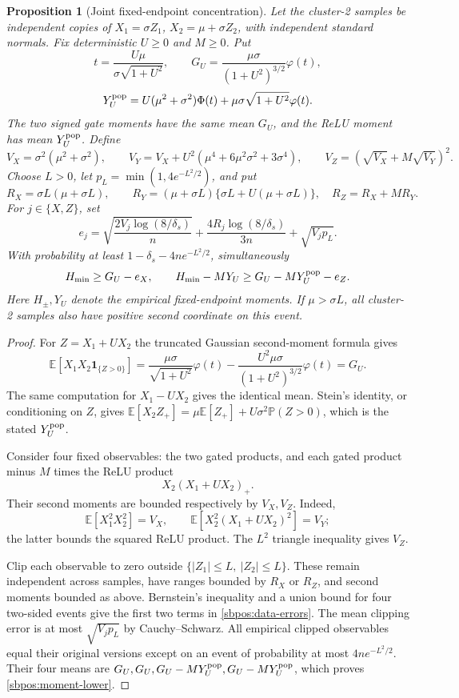 \documentclass{article} %
\theoremstyle{plain}
\newtheorem{proposition}[theorem]{Proposition}
\theoremstyle{definition}
\theoremstyle{remark}
\begin{document}
\begin{proposition}[Joint fixed-endpoint concentration]
\label{sbpos:concentration}
Let the cluster-2 samples be independent copies of
$X_1=\sigma Z_1$, $X_2=\mu+\sigma Z_2$, with independent standard normals.
Fix deterministic $U\ge0$ and $M\ge0$. Put
\[
 t=\frac{U\mu}{\sigma\sqrt{1+U^2}},\qquad
 G_U=\frac{\mu\sigma}{(1+U^2)^{3/2}}\varphi(t),
\]
\[
 Y_U^{\rm pop}=U(\mu^2+\sigma^2)\Phi(t)
                    +\mu\sigma\sqrt{1+U^2}\varphi(t).
\]
The two signed gate moments have the same mean $G_U$, and the ReLU
moment has mean $Y_U^{\rm pop}$. Define
\[
 V_X=\sigma^2(\mu^2+\sigma^2),\qquad
 V_Y=V_X+U^2(\mu^4+6\mu^2\sigma^2+3\sigma^4),\qquad
 V_Z=(\sqrt{V_X}+M\sqrt{V_Y})^2.
\]
Choose $L>0$, let $p_L=\min(1,4e^{-L^2/2})$, and put
\[
 R_X=\sigma L(\mu+\sigma L),\qquad
 R_Y=(\mu+\sigma L)\{\sigma L+U(\mu+\sigma L)\},\quad
 R_Z=R_X+MR_Y.
\]
For $j\in\{X,Z\}$, set
\begin{equation}\label{sbpos:data-errors}
 e_j=\sqrt{\frac{2V_j\log(8/\delta_s)}n}
       +\frac{4R_j\log(8/\delta_s)}{3n}
       +\sqrt{V_jp_L}.
\end{equation}
With probability at least $1-\delta_s-4ne^{-L^2/2}$, simultaneously
\begin{equation}\label{sbpos:moment-lower}
 H_{\min}\ge G_U-e_X,\qquad
 H_{\min}-MY_U\ge G_U-MY_U^{\rm pop}-e_Z.
\end{equation}
Here $H_\pm,Y_U$ denote the empirical fixed-endpoint moments.
If $\mu>\sigma L$, all cluster-2 samples also have positive second
coordinate on this event.
\end{proposition}
\begin{proof}
For $Z=X_1+UX_2$ the truncated Gaussian second-moment formula gives
\[
 \mathbb E[X_1X_2\mathbf1_{\{Z>0\}}]
 =\frac{\mu\sigma}{\sqrt{1+U^2}}\varphi(t)
  -\frac{U^2\mu\sigma}{(1+U^2)^{3/2}}\varphi(t)=G_U.
\]
The same computation for $X_1-UX_2$ gives the identical mean.
Stein's identity, or conditioning on $Z$, gives
$\mathbb E[X_2Z_+]=\mu\mathbb E[Z_+]+U\sigma^2\mathbb P(Z>0)$,
which is the stated $Y_U^{\rm pop}$.

Consider four fixed observables: the two gated products, and each gated
product minus $M$ times the ReLU product
\[ X_2(X_1+UX_2)_+. \]
Their second moments are bounded respectively by $V_X,V_Z$.
Indeed,
\[
 \mathbb E[X_1^2X_2^2]=V_X,\qquad
 \mathbb E[X_2^2(X_1+UX_2)^2]=V_Y;
\]
the latter bounds the squared ReLU product. The $L^2$ triangle inequality
gives $V_Z$.

Clip each observable to zero outside
$\{|Z_1|\le L,\ |Z_2|\le L\}$. These remain independent across samples,
have ranges bounded by $R_X$ or $R_Z$, and second moments bounded as above.
Bernstein's inequality and a union bound for four two-sided events give
the first two terms in \eqref{sbpos:data-errors}. The mean clipping error
is at most $\sqrt{V_jp_L}$ by Cauchy--Schwarz.
All empirical clipped observables equal their original versions except
on an event of probability at most $4ne^{-L^2/2}$.
Their four means are $G_U,G_U,G_U-MY_U^{\rm pop},G_U-MY_U^{\rm pop}$,
which proves \eqref{sbpos:moment-lower}.
\end{proof}
\end{document}
